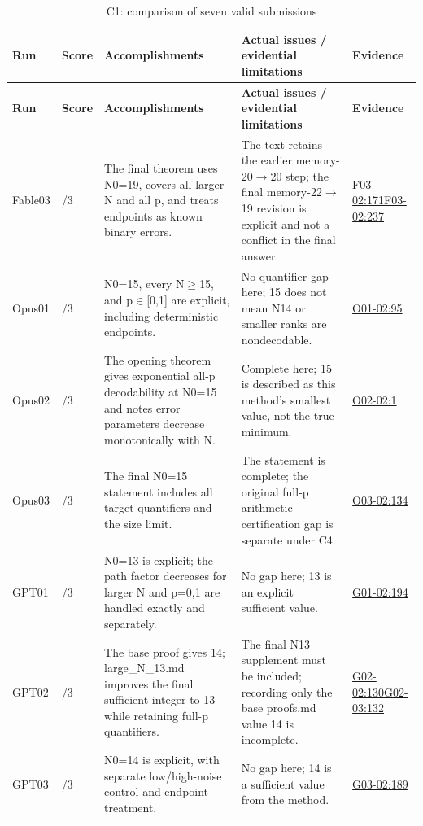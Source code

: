 \documentclass[11pt,a4paper]{article}
\begin{document}
{\fontsize{9.0}{12.6}\selectfont
\setlength{\tabcolsep}{2.5pt}
\begin{longtable}{>{\raggedright\arraybackslash}p{}>{\raggedright\arraybackslash}p{}>{\raggedright\arraybackslash}p{}>{\raggedright\arraybackslash}p{}>{\raggedright\arraybackslash}p{}}
\caption{C1: comparison of seven valid submissions}\\
\toprule
\textbf{Run} & \textbf{Score} & \textbf{Accomplishments} & \textbf{Actual issues /\allowbreak{} evidential limitations} & \textbf{Evidence}\tabularnewline
\midrule
\endfirsthead
\toprule
\textbf{Run} & \textbf{Score} & \textbf{Accomplishments} & \textbf{Actual issues /\allowbreak{} evidential limitations} & \textbf{Evidence}\tabularnewline
\midrule
\endhead
{}Fable03 & 3/\allowbreak{}3 & The final theorem uses N0=19,\allowbreak{} covers all larger N and all p,\allowbreak{} and treats endpoints as known binary errors. & The text retains the earlier memory-20\ensuremath{\rightarrow}20 step; the final memory-22\ensuremath{\rightarrow}19 revision is explicit and not a conflict in the final answer. & \hyperref[src:F03-02]{F03-02:171}\newline \hyperref[src:F03-02]{F03-02:237}\tabularnewline
{}Opus01 & 3/\allowbreak{}3 & N0=15,\allowbreak{} every N\ensuremath{\geq}15,\allowbreak{} and p\ensuremath{\in}[0,\allowbreak{}1] are explicit,\allowbreak{} including deterministic endpoints. & No quantifier gap here; 15 does not mean N14 or smaller ranks are nondecodable. & \hyperref[src:O01-02]{O01-02:95}\tabularnewline
{}Opus02 & 3/\allowbreak{}3 & The opening theorem gives exponential all-p decodability at N0=15 and notes error parameters decrease monotonically with N. & Complete here; 15 is described as this method’s smallest value,\allowbreak{} not the true minimum. & \hyperref[src:O02-02]{O02-02:1}\tabularnewline
{}Opus03 & 3/\allowbreak{}3 & The final N0=15 statement includes all target quantifiers and the size limit. & The statement is complete; the original full-p arithmetic-certification gap is separate under C4. & \hyperref[src:O03-02]{O03-02:134}\tabularnewline
{}GPT01 & 3/\allowbreak{}3 & N0=13 is explicit; the path factor decreases for larger N and p=0,\allowbreak{}1 are handled exactly and separately. & No gap here; 13 is an explicit sufficient value. & \hyperref[src:G01-02]{G01-02:194}\tabularnewline
{}GPT02 & 3/\allowbreak{}3 & The base proof gives 14; large\_N\_13.md improves the final sufficient integer to 13 while retaining full-p quantifiers. & The final N13 supplement must be included; recording only the base proofs.md value 14 is incomplete. & \hyperref[src:G02-02]{G02-02:130}\newline \hyperref[src:G02-03]{G02-03:132}\tabularnewline
{}GPT03 & 3/\allowbreak{}3 & N0=14 is explicit,\allowbreak{} with separate low/\allowbreak{}high-noise control and endpoint treatment. & No gap here; 14 is a sufficient value from the method. & \hyperref[src:G03-02]{G03-02:189}\tabularnewline
\bottomrule
\end{longtable}
}
\end{document}
